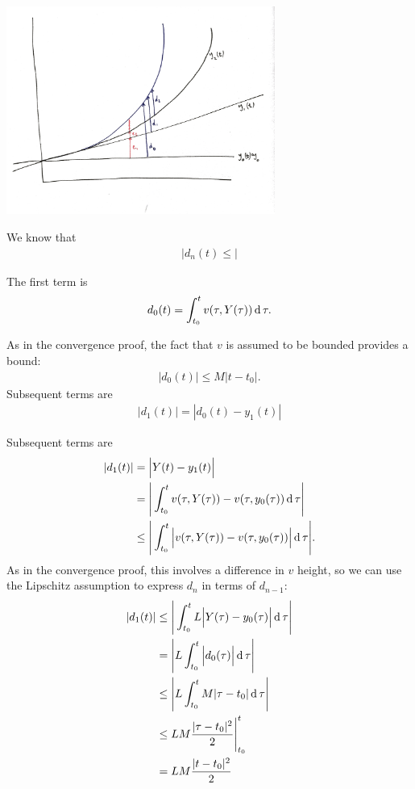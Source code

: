 \begin{mdframed}
\includegraphics[width=250pt]{img/differential-equations-picard-convergence-uniqueness.png}
\end{mdframed}

We know that
\begin{align*}
  |d_n(t) \leq|
\end{align*}


The first term is
\begin{align*}
  d_0(t) = \int_{t_0}^t v(\tau, Y(\tau)) \operatorname{\text{d}}\tau.
\end{align*}

As in the convergence proof, the fact that $v$ is assumed to be bounded
provides a bound:
\begin{align*}
  |d_0(t)| \leq M|t - t_0|.
\end{align*}
Subsequent terms are
\begin{align*}
  |d_1(t)| = |d_0(t) - y_1(t)|
\end{align*}


Subsequent terms are
\begin{align*}
  |d_1(t)| &=    \Big|Y(t) - y_1(t)\Big|\\
           &=    \Bigg|\int_{t_0}^t v(\tau, Y(\tau)) - v(\tau, y_0(\tau)) \operatorname{\text{d}}\tau\Bigg|\\
           &\leq \Bigg|\int_{t_0}^t \Big|v(\tau, Y(\tau)) - v(\tau, y_0(\tau))\Big| \operatorname{\text{d}}\tau\Bigg|.
\end{align*}
As in the convergence proof, this involves a difference in $v$ height, so we
can use the Lipschitz assumption to express $d_n$ in terms of $d_{n-1}$:
\begin{align*}
  |d_1(t)| &\leq \Bigg|\int_{t_0}^t L\Big|Y(\tau) - y_0(\tau)\Big| \operatorname{\text{d}}\tau\Bigg|\\
           &   = \Bigg|L\int_{t_0}^t \Big|d_0(\tau)\Big| \operatorname{\text{d}}\tau\Bigg|\\
           &\leq \Bigg|L\int_{t_0}^t M|\tau - t_0| \operatorname{\text{d}}\tau\Bigg|\\
           &\leq LM\frac{|\tau - t_0|^2}{2}\Bigg|_{t_0}^t\\
           &   = LM\frac{|t - t_0|^2}{2}\\
\end{align*}




